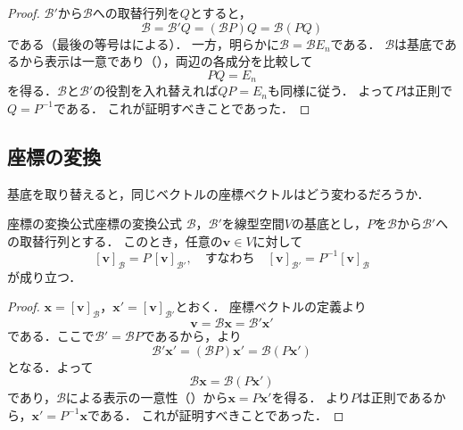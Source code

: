 \begin{leftbar}
\begin{proof}
  $\mathcal{B}'$から$\mathcal{B}$への取替行列を$Q$とすると，
  \[
    \mathcal{B} = \mathcal{B}' Q = (\mathcal{B}P)Q = \mathcal{B}(PQ)
  \]
  である（最後の等号はによる）．
  一方，明らかに$\mathcal{B} = \mathcal{B}E_n$である．
  $\mathcal{B}$は基底であるから表示は一意であり（），両辺の各成分を比較して
  \[
    PQ = E_n
  \]
  を得る．$\mathcal{B}$と$\mathcal{B}'$の役割を入れ替えれば$QP = E_n$も同様に従う．
  よって$P$は正則で$Q = P^{-1}$である．
  これが証明すべきことであった．
\end{proof}
\end{leftbar}

\subsection{座標の変換}

基底を取り替えると，同じベクトルの座標ベクトルはどう変わるだろうか．

\begin{theorem}{座標の変換公式}{座標の変換公式}
  $\mathcal{B}$，$\mathcal{B}'$を線型空間$V$の基底とし，$P$を$\mathcal{B}$から$\mathcal{B}'$への取替行列とする．
  このとき，任意の$\bm{v} \in V$に対して
  \[
    [\bm{v}]_{\mathcal{B}} = P \, [\bm{v}]_{\mathcal{B}'},
    \quad \text{すなわち} \quad
    [\bm{v}]_{\mathcal{B}'} = P^{-1} [\bm{v}]_{\mathcal{B}}
  \]
  が成り立つ．
\end{theorem}

\begin{leftbar}
\begin{proof}
  $\bm{x} = [\bm{v}]_{\mathcal{B}}$，$\bm{x}' = [\bm{v}]_{\mathcal{B}'}$とおく．
  座標ベクトルの定義より
  \[
    \bm{v} = \mathcal{B}\bm{x} = \mathcal{B}'\bm{x}'
  \]
  である．ここで$\mathcal{B}' = \mathcal{B}P$であるから，より
  \[
    \mathcal{B}'\bm{x}' = (\mathcal{B}P)\bm{x}' = \mathcal{B}(P\bm{x}')
  \]
  となる．よって
  \[
    \mathcal{B}\bm{x} = \mathcal{B}(P\bm{x}')
  \]
  であり，$\mathcal{B}$による表示の一意性（）から$\bm{x} = P\bm{x}'$を得る．
  より$P$は正則であるから，$\bm{x}' = P^{-1}\bm{x}$である．
  これが証明すべきことであった．
\end{proof}
\end{leftbar}

